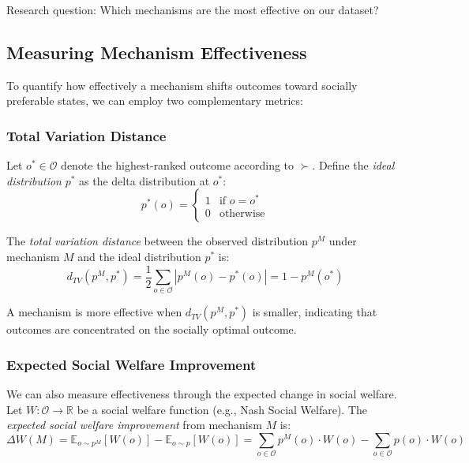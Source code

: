 \documentclass[11pt]{amsart}
\begin{document}
Research question: Which mechanisms are the most effective on our dataset?

\subsection{Measuring Mechanism Effectiveness}

To quantify how effectively a mechanism shifts outcomes toward socially preferable states, we can employ two complementary metrics:

\subsubsection{Total Variation Distance}

Let $o^* \in \mathcal{O}$ denote the highest-ranked outcome according to $\succ$. Define the \textit{ideal distribution} $p^*$ as the delta distribution at $o^*$:
\begin{equation}
p^*(o) = \begin{cases}
1 & \text{if } o = o^* \\
0 & \text{otherwise}
\end{cases}
\end{equation}


The \textit{total variation distance} between the observed distribution $p^M$ under mechanism $M$ and the ideal distribution $p^*$ is:
\begin{equation}
d_{TV}(p^M, p^*) = \frac{1}{2} \sum_{o \in \mathcal{O}} |p^M(o) - p^*(o)| = 1 - p^M(o^*)
\end{equation}

A mechanism is more effective when $d_{TV}(p^M, p^*)$ is smaller, indicating that outcomes are concentrated on the socially optimal outcome.

\subsubsection{Expected Social Welfare Improvement}

We can also measure effectiveness through the expected change in social welfare. Let $W: \mathcal{O} \to \mathbb{R}$ be a social welfare function (e.g., Nash Social Welfare). The \textit{expected social welfare improvement} from mechanism $M$ is:
\begin{equation}
\Delta W(M) = \mathbb{E}_{o \sim p^M}[W(o)] - \mathbb{E}_{o \sim p}[W(o)] = \sum_{o \in \mathcal{O}} p^M(o) \cdot W(o) - \sum_{o \in \mathcal{O}} p(o) \cdot W(o)
\end{equation}
\end{document}

